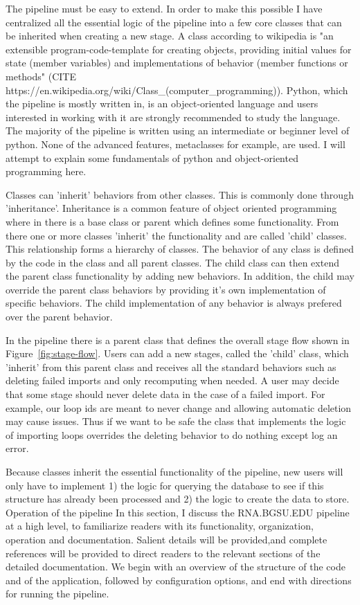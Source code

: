 The pipeline must be easy to extend. In order to make this possible I have
centralized all the essential logic of the pipeline into a few core classes that
can be inherited when creating a new stage. A class according to wikipedia is
"an extensible program-code-template for creating objects, providing initial
values for state (member variables) and implementations of behavior (member
functions or methods" (CITE
https://en.wikipedia.org/wiki/Class\_(computer\_programming)). Python, which the
pipeline is mostly written in, is an object-oriented language and users
interested in working with it are strongly recommended to study the language.
The majority of the pipeline is written using an intermediate or beginner level
of python. None of the advanced features, metaclasses for example, are used. I
will attempt to explain some fundamentals of python and object-oriented
programming here.

Classes can 'inherit' behaviors from other classes. This is commonly done
through 'inheritance'. Inheritance is a common feature of object oriented
programming where in there is a base class or parent which defines some
functionality. From there one or more classes 'inherit' the functionality and
are called 'child' classes. This relationship forms a hierarchy of classes. The
behavior of any class is defined by the code in the class and all parent
classes. The child class can then extend the parent class functionality by
adding new behaviors. In addition, the child may override the parent class
behaviors by providing it's own implementation of specific behaviors. The child
implementation of any behavior is always prefered over the parent behavior.

In the pipeline there is a parent class that defines the overall stage flow
shown in Figure~\ref{fig:stage-flow}. Users can add a  new stages, called the
'child' class, which 'inherit' from this parent class and receives all the
standard behaviors such as deleting failed imports and only recomputing when
needed. A user may decide that some stage should never delete data in the case
of a failed import. For example, our loop ids are meant to never change and
allowing automatic deletion may cause issues. Thus if we want to be safe the
class that implements the logic of importing loops overrides the deleting
behavior to do nothing except log an error.

Because classes inherit the essential functionality of the pipeline, new users will only have to
implement 1) the logic for querying the database to see if this structure has already been
processed and 2) the logic to create the data to store.
Operation of the pipeline
In this section, I discuss the RNA.BGSU.EDU pipeline at a high level, to familiarize readers with
its functionality, organization, operation and documentation. Salient details will be provided,and
complete references will be provided to direct readers to the relevant sections of the detailed
documentation. We begin with an overview of the structure of the code and of the application,
followed by configuration options, and end with directions for running the pipeline.

